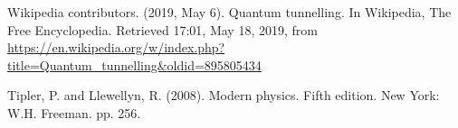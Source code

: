 \documentclass[a4paper,12pt,twoside]{article}
\newcommand{\bracket}[1]{\left(#1\right)}
\newcommand{\abs}[1]{\left|#1\right|}
\begin{document}




\newpage
\begin{thebibliography}{99}
   Wikipedia contributors. (2019, May 6). Quantum tunnelling. In Wikipedia, The Free Encyclopedia. Retrieved 17:01, May 18, 2019, from \url{https://en.wikipedia.org/w/index.php?title=Quantum_tunnelling&oldid=895805434}

   Tipler, P. and Llewellyn, R. (2008). Modern physics. Fifth edition. New York: W.H. Freeman. pp. 256.
\end{thebibliography}
\end{document}
